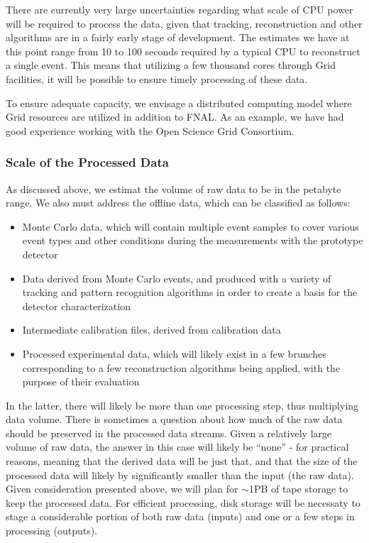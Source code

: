 There are currently very large uncertainties regarding what scale of CPU power will be required to process the data, given that tracking, reconstruction and
other algorithms are in a fairly early stage of development. The estimates we have at this point range from 10 to 100 seconds required by a typical
CPU to reconstruct a single event. This means that utilizing a few thousand cores through Grid facilities, it will be possible to ensure timely processing of these data.

To ensure adequate capacity, we envisage a distributed computing model where Grid resources are utilized in addition to FNAL.
As an example, we have had good experience working with the Open Science Grid Consortium.



\subsubsection{Scale of the Processed Data}
As discussed above, we estimat the volume of raw data to be in the petabyte range. We also must address the offline data, which can be classified as follows:
\begin{itemize}
\item Monte Carlo data, which will contain multiple event samples to cover various event types and other conditions during the measurements with the prototype detector
\item Data derived from Monte Carlo events, and produced with a variety of tracking and pattern recognition algorithms in order to create a basis for the detector characterization
\item Intermediate calibration files, derived from calibration data
\item Processed experimental data, which will likely exist in a few brunches corresponding to a few reconstruction algorithms being applied, with the purpose of their evaluation
\end{itemize}

In the latter, there will likely be more than one processing step, thus multiplying data volume. There is sometimes a question about how much of the raw data should be preserved in
the processed data streams. Given a relatively large volume of raw data, the answer in this case will likely be ``none'' - for practical reasons, meaning that the derived data will
be just that, and that the size of the processed data will likely by significantly smaller than the input (the raw data). Given consideration presented above, we will plan for
$\sim$1PB of tape storage to keep the processed data. For efficient processing, disk storage will be necessaty to stage a considerable portion of both raw data (inputs) and
one or a few steps in processing (outputs).

